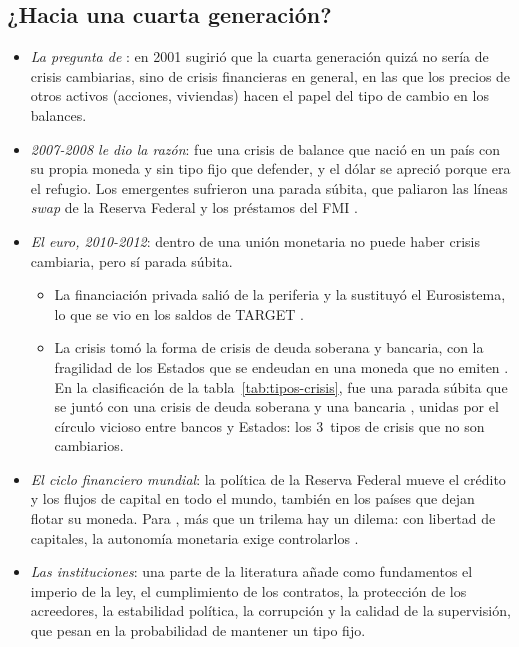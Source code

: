 \documentclass[11pt]{article}
\begin{document}
\subsection{¿Hacia una cuarta generación?}\label{sec:cuarta}

\begin{itemize}
\item \emph{La pregunta de }: en 2001 sugirió que la cuarta generación quizá no sería de crisis cambiarias, sino de crisis financieras en general, en las que los precios de otros activos (acciones, viviendas) hacen el papel del tipo de cambio en los balances\nocite{Krugman2001Next}.
\item \emph{2007-2008 le dio la razón}: fue una crisis de balance que nació en un país con su propia moneda y sin tipo fijo que defender, y el dólar se apreció porque era el refugio. Los emergentes sufrieron una parada súbita, que paliaron las líneas \emph{swap} de la Reserva Federal y los préstamos del FMI  .
\item \emph{El euro, 2010-2012}: dentro de una unión monetaria no puede haber crisis cambiaria, pero sí parada súbita.
  \begin{itemize}
  \item La financiación privada salió de la periferia y la sustituyó el Eurosistema, lo que se vio en los saldos de TARGET\nocite{MerlerPisaniFerry2012Sudden}  .
  \item La crisis tomó la forma de crisis de deuda soberana y bancaria, con la fragilidad de los Estados que se endeudan en una moneda que no emiten  . En la clasificación de la tabla~\ref{tab:tipos-crisis}, fue una parada súbita que se juntó con una crisis de deuda soberana  y una bancaria , unidas por el círculo vicioso entre bancos y Estados: los 3~tipos de crisis que no son cambiarios.
  \end{itemize}
\item \emph{El ciclo financiero mundial}: la política de la Reserva Federal mueve el crédito y los flujos de capital en todo el mundo, también en los países que dejan flotar su moneda. Para \textcite{Rey2013Dilema}, más que un trilema hay un dilema: con libertad de capitales, la autonomía monetaria exige controlarlos  .
\item \emph{Las instituciones}: una parte de la literatura añade como fundamentos el imperio de la ley, el cumplimiento de los contratos, la protección de los acreedores, la estabilidad política, la corrupción y la calidad de la supervisión, que pesan en la probabilidad de mantener un tipo fijo\nocite{Breuer2004Exegesis}.

\end{itemize}
\end{document}
